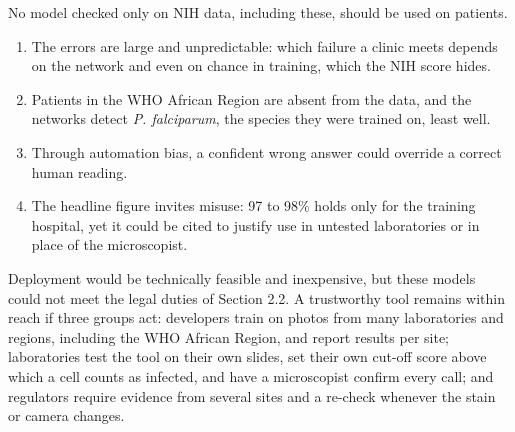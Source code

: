 \documentclass[11pt,a4paper]{article}
\begin{document}
No model checked only on NIH data, including these, should be used on patients.

\begin{enumerate}
\item The errors are large and unpredictable: which failure a clinic meets depends on the network and even on chance in training, which the NIH score hides.
\item Patients in the WHO African Region are absent from the data, and the networks detect \emph{P. falciparum}, the species they were trained on, least well.
\item Through automation bias, a confident wrong answer could override a correct human reading.
\item The headline figure invites misuse: 97 to 98\% holds only for the training hospital, yet it could be cited to justify use in untested laboratories or in place of the microscopist.
\end{enumerate}

Deployment would be technically feasible and inexpensive, but these models could not meet the legal duties of Section 2.2. A trustworthy tool remains within reach if three groups act: developers train on photos from many laboratories and regions, including the WHO African Region, and report results per site; laboratories test the tool on their own slides, set their own cut-off score above which a cell counts as infected, and have a microscopist confirm every call; and regulators require evidence from several sites and a re-check whenever the stain or camera changes.

\printbibliography[heading=ctbib,title=References]
\end{document}
